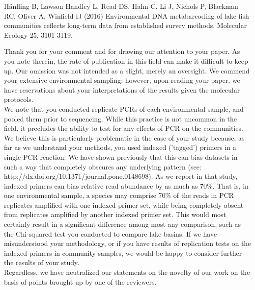 \documentclass{article}
\newenvironment{response}
	{
	\begin{adjustwidth}{1cm}{0cm}
	\color{peerjBlue}
	}
	{
	\end{adjustwidth}
	}
\begin{document}
Hänfling B, Lawson Handley L, Read DS, Hahn C, Li J, Nichols P, Blackman RC, Oliver A, Winfield IJ (2016) Environmental DNA metabarcoding of lake fish communities reflects long-term data from established survey methods. Molecular Ecology 25, 3101-3119.
\begin{response}
  Thank you for your comment and for drawing our attention to your paper.
	As you note therein, the rate of publication in this field can make it difficult to keep up.
	Our omission was not intended as a slight, merely an oversight. %
	We commend your extensive environmental sampling; however, upon reading your paper, we have reservations about your interpretations of the results given the molecular protocols. %
  \\


	We note that you conducted replicate PCRs of each environmental sample, and pooled them prior to sequencing.
	While this practice is not uncommon in the field, it precludes the ability to test for any effects of PCR on the communities.
	We believe this is particularly problematic in the case of your study because, as far as we understand your methods, you used indexed ('tagged') primers in a single PCR reaction.
	We have shown previously that this can bias datasets in such a way that completely obscures any underlying pattern (see: http://dx.doi.org/10.1371/journal.pone.0148698).
	As we report in that study, indexed primers can bias relative read abundance by as much as 70\%.
	That is, in one environmental sample, a species may comprise 70\% of the reads in PCR replicates amplified with one indexed primer set, while being completely absent from replicates amplified by another indexed primer set.
	This would most certainly result in a significant difference among most any comparison, such as the Chi-squared test you conducted to compare lake basins.
	If we have misunderstood your methodology, or if you have results of replication tests on the indexed primers in community samples, we would be happy to consider further the results of your study.
  \\


	Regardless, we have neutralized our statements on the novelty of our work on the basis of points brought up by one of the reviewers.



\end{response}
\end{document}

